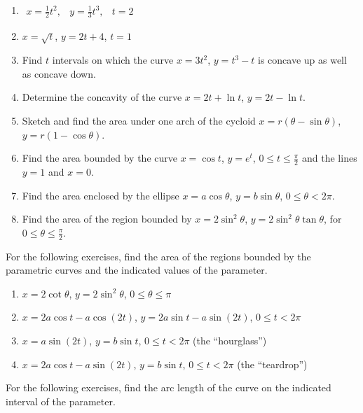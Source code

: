 \documentclass{exercises}
\begin{document}
\begin{enumerate}[resume]
\item $\begin{matrix}x=\frac{1}{2}t^{2}, & y=\frac{1}{3}t^{3}, & t=2\end{matrix}$
\item $x=\sqrt{t}$, $y=2t+4$, $t=1$
\item Find $t$ intervals on which the curve $x=3t^{2}$, $y=t^{3}-t$ is concave up as well as concave down.
\item Determine the concavity of the curve $x=2t+\ln t$, $y=2t-\ln t$.
\item Sketch and find the area under one arch of the cycloid $x=r(\theta-\sin \theta)$, $y=r(1-\cos \theta)$.
\item Find the area bounded by the curve $x=\cos t$, $y=e^{t}$, $0\le t\le \frac{\pi}{2}$ and the lines $y=1$ and $x=0$.
\item Find the area enclosed by the ellipse $x=a\cos \theta$, $y=b\sin \theta$, $0\le \theta<2\pi$.
\item Find the area of the region bounded by $x=2\sin^{2}\theta$, $y=2\sin^{2}\theta\tan \theta$, for $0\le \theta\le \frac{\pi}{2}$.
\end{enumerate}

For the following exercises, find the area of the regions bounded by the parametric curves and the indicated values of the parameter.

\begin{enumerate}[resume]
\item $x=2\cot \theta$, $y=2\sin^{2}\theta$, $0\le \theta\le \pi$
\item \techrequired $x=2a\cos t-a\cos(2t)$, $y=2a\sin t-a\sin(2t)$, $0\le t<2\pi$
\item \techrequired $x=a\sin(2t)$, $y=b\sin t$, $0\le t<2\pi$ (the ``hourglass'')
\item \techrequired $x=2a\cos t-a\sin(2t)$, $y=b\sin t$, $0\le t<2\pi$ (the ``teardrop'')
\end{enumerate}

For the following exercises, find the arc length of the curve on the indicated interval of the parameter.
\end{document}
